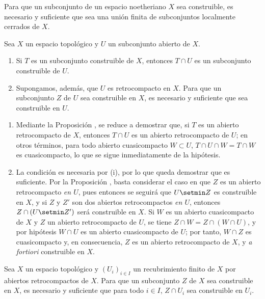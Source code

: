 \begin{corollary}[9.1.7]
\label{0.9.1.7}
\label{0.9.1.7-fr}
Para que un subconjunto de un espacio noetheriano $X$ sea construible, es necesario y suficiente que sea una unión finita de subconjuntos localmente cerrados de $X$.
\end{corollary}

\begin{proposition}[9.1.8]
\label{0.9.1.8}
\label{0.9.1.8-fr}
Sea $X$ un espacio topológico y $U$ un subconjunto abierto de $X$.
\begin{enumerate}
  \item[{\rm(i)}] Si $T$ es un subconjunto construible de $X$, entonces $T\cap U$ es un subconjunto construible de $U$.
  \item[{\rm(ii)}] Supongamos, además, que $U$ es retrocompacto en $X$. Para que un subconjunto $Z$ de $U$ sea construible en $X$, es necesario y suficiente que sea construible en $U$.
\end{enumerate}
\end{proposition}


\medskip\noindent
\begin{enumerate}
  \item[(i)] Mediante la Proposición , se reduce a demostrar que, si $T$ es un abierto retrocompacto de $X$, entonces $T\cap U$ es un abierto retrocompacto de $U$; en otros términos, para todo abierto cuasicompacto $W\subset U$, $T\cap U\cap W=T\cap W$ es cuasicompacto, lo que se sigue inmediatamente de la hipótesis.
  \item[(ii)] La condición es necesaria por (i), por lo que queda demostrar que es suficiente.
    Por la Proposición , basta considerar el caso en que $Z$ es un abierto retrocompacto \emph{en $U$}, pues entonces se seguirá que $U\setmin Z$ es construible en $X$, y si $Z$ y $Z'$ son dos abiertos retrocompactos \emph{en $U$}, entonces $Z\cap(U\setmin Z')$ será construible en $X$.
    Si $W$ es un abierto cuasicompacto de $X$ y $Z$ un abierto retrocompacto de $U$, se tiene $Z\cap W=Z\cap(W\cap U)$, y por hipótesis $W\cap U$ es un abierto cuasicompacto de $U$; por tanto, $W\cap Z$ es cuasicompacto y, en consecuencia, $Z$ es un abierto retrocompacto de $X$, y \emph{a fortiori} construible en $X$.
\end{enumerate}


\begin{corollary}[9.1.9]
\label{0.9.1.9}
\label{0.9.1.9-fr}
Sea $X$ un espacio topológico y $(U_i)_{i\in I}$ un recubrimiento finito de $X$ por abiertos retrocompactos de $X$.
Para que un subconjunto $Z$ de $X$ sea construible en $X$, es necesario y suficiente que para todo $i\in I$, $Z\cap U_i$ sea construible en $U_i$.
\end{corollary}

